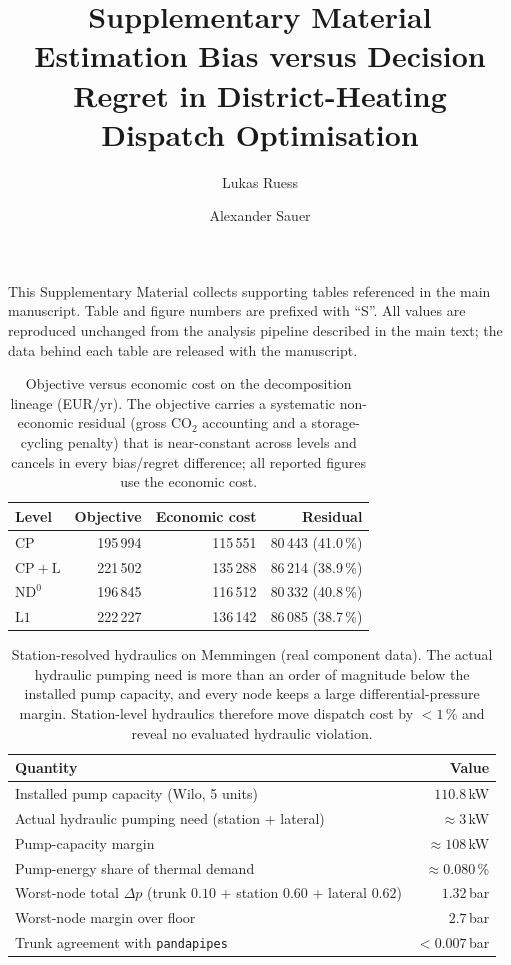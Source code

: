 \documentclass[11pt,a4paper]{article}
\title{Supplementary Material\\[2pt]
  \large Estimation Bias versus Decision Regret in District-Heating Dispatch Optimisation}
\author{Lukas Ruess \and Alexander Sauer}
\date{}
\newcommand{\CP}{\ensuremath{\mathrm{CP}}}
\newcommand{\CPL}{\ensuremath{\mathrm{CP{+}L}}}
\newcommand{\NDz}{\ensuremath{\mathrm{ND^{0}}}}
\newcommand{\Lone}{\ensuremath{\mathrm{L1}}}
\begin{document}
\maketitle

This Supplementary Material collects supporting tables referenced in the main manuscript.
Table and figure numbers are prefixed with ``S''. All values are reproduced unchanged from
the analysis pipeline described in the main text; the data behind each table are released
with the manuscript.

\begin{table}[t]
\centering
\caption{Objective versus economic cost on the decomposition lineage (EUR/yr). The objective
carries a systematic non-economic residual (gross CO$_2$ accounting and a storage-cycling
penalty) that is near-constant across levels and cancels in every bias/regret difference; all
reported figures use the economic cost.}
\label{tab:objdecomp}
\begin{tabular}{lrrr}
\hline
Level & Objective & Economic cost & Residual \\
\hline
$\CP$   & 195\,994 & 115\,551 & 80\,443 (41.0\,\%) \\
$\CPL$  & 221\,502 & 135\,288 & 86\,214 (38.9\,\%) \\
$\NDz$  & 196\,845 & 116\,512 & 80\,332 (40.8\,\%) \\
$\Lone$ & 222\,227 & 136\,142 & 86\,085 (38.7\,\%) \\
\hline
\end{tabular}
\end{table}
\begin{table}[t]
\centering
\caption{Station-resolved hydraulics on Memmingen (real component data). The actual hydraulic
pumping need is more than an order of magnitude below the installed pump capacity, and every node keeps a
large differential-pressure margin. Station-level hydraulics therefore move dispatch cost by
$<1$\,\% and reveal no evaluated hydraulic violation.}
\label{tab:hydraulics}
\begin{tabular}{lr}
\hline
Quantity & Value \\
\hline
Installed pump capacity (Wilo, 5 units) & $110.8$\,kW \\
Actual hydraulic pumping need (station + lateral) & $\approx 3$\,kW \\
Pump-capacity margin & $\approx 108$\,kW \\
Pump-energy share of thermal demand & $\approx 0.080$\,\% \\
Worst-node total $\Delta p$ (trunk $0.10$ + station $0.60$ + lateral $0.62$) & $1.32$\,bar \\
Worst-node margin over floor & $2.7$\,bar \\
Trunk agreement with \texttt{pandapipes} & $<0.007$\,bar \\
\hline
\end{tabular}
\end{table}
\end{document}
